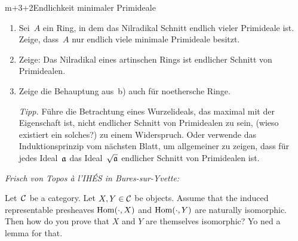 \documentclass{uebblatt}
\begin{document}
\begin{aufgabe}{m+3+2}{Endlichkeit minimaler Primideale}
\begin{enumerate}
\item Sei~$A$ ein Ring, in dem das Nilradikal Schnitt endlich vieler Primideale
ist. Zeige, dass~$A$ nur endlich viele minimale Primideale besitzt.
\item Zeige: Das Nilradikal eines artinschen Rings ist endlicher Schnitt
von Primidealen.
\item Zeige die Behauptung aus~b) auch für noethersche Ringe.

{\scriptsize\emph{Tipp.} Führe die Betrachtung eines Wurzelideals, das maximal
mit der Eigenschaft ist, nicht endlicher Schnitt von Primidealen zu sein, (wieso
existiert ein solches?) zu einem Widerspruch. Oder verwende das
Induktionsprinzip vom nächsten Blatt, um allgemeiner zu zeigen, dass für jedes
Ideal~$\mathfrak{a}$ das Ideal~$\sqrt{\mathfrak{a}}$ endlicher Schnitt von Primidealen ist.\par}
\end{enumerate}
\end{aufgabe}

\centering
\emph{Frisch von Topos à l'IHÉS in Bures-sur-Yvette:} \\[0.5em]
\begin{minipage}{0.9\textwidth}
Let~$\mathcal{C}$ be a category. Let $X,Y \in \mathcal{C}$ be objects.
Assume that the induced representable presheaves $\mathrm{Hom}(\cdot,X)$ and
$\mathrm{Hom}(\cdot,Y)$ are naturally isomorphic. Then how do you prove that $X$ and $Y$
are themselves isomorphic? Yo ned a lemma for that.
\end{minipage}
\par
\end{document}
